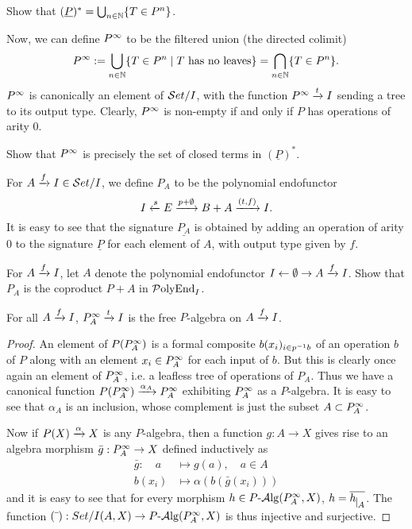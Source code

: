 \begin{exercise}
    Show that $(\underline{P})^*=\bigcup_{n\in\NN} \{ T\in P^n \}$.
\end{exercise}


Now, we can define $P^{\moo}$ to be the filtered union (the directed colimit)
\[
    P^\moo := \bigcup_{n\in\NN} \{ T\in P^n \ssep T \text{ has no leaves} \} =
    \bigcap_{n\in\NN} \{ T\in P^n \}.
\]
$P^\moo$ is canonically an element of $\Set/I$, with the function
$P^\moo\xto{t}I$ sending a tree to its output type. Clearly, $P^\moo$ is
non-empty if and only if $P$ has operations of arity $0$.

\begin{exercise}
    Show that $P^\moo$ is precisely the set of closed terms in $(\underline{P})^*$.
\end{exercise}

For $A\xto{f} I \in \Set/I$, we define $P_A$ to be the polynomial endofunctor
\[
    I\xot{s} E\xto{p+\emptyset} B+A \xto{(t,f)} I.
\]
It is easy to see that the signature $\underline{P_A}$ is obtained by adding an
operation of arity $0$ to the signature $\underline{P}$ for each element of $A$,
with output type given by $f$.

\begin{exercise}
    For $A\xto{f} I$, let $A$ denote the polynomial endofunctor
    $I\ot\emptyset\to A\xto{f} I$. Show that $P_A$ is the coproduct $P+A$ in
    $\PolyEnd_I$.
\end{exercise}

\begin{lemma} \label{lemma:free-algebra}
    For all $A\xto{f}I$, $P_A^\moo\xto{t}I$ is the free $P$-algebra on
    $A\xto{f}I$.
\end{lemma}
\begin{proof}
    An element of $P(P_A^\moo)$ is a formal composite $b(x_i)_{i\in p\inv b}$ of
    an operation $b$ of $P$ along with an element $x_i\in P_A^\moo$ for each
    input of $b$. But this is clearly once again an element of $P_A^\moo$, i.e.
    a leafless tree of operations of $P_A$. Thus we have a canonical function
    $P(P_A^\moo)\xto{\alpha_A} P_A^\moo$ exhibiting $P_A^\moo$ as a $P$-algebra.
    It is easy to see that $\alpha_A$ is an inclusion, whose complement is just
    the subset $A\subset P_A^\moo$.

    Now if $P(X)\xto{\alpha} X$ is any $P$-algebra, then a function $g:A\to X$
    gives rise to an algebra morphism $\bar{g}:P_A^\moo\to X$ defined
    inductively as
    \begin{align*}
      \bar{g} :  \quad a &\mapsto g(a),\quad a\in A \\
      b(x_i) &\mapsto \alpha(b(\bar{g}(x_i)))
    \end{align*}
    and it is easy to see that for every morphism $h\in P\alg(P_A^\moo,X)$,
    $h=\overline{h\restr A}$. The function $(\bar{\ }):Set/I(A,X)\to
    P\alg(P_A^\moo,X)$ is thus injective and surjective.
\end{proof}

